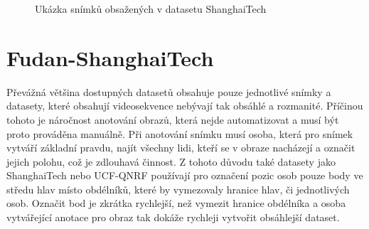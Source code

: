 \begin{figure}[h!]
	\centering
	\caption{Ukázka snímků obsažených v datasetu ShanghaiTech \cite{ShanghaiTech}}
	\label{fig:SH_TECH}
\end{figure}


\section{Fudan-ShanghaiTech}
Převážná většina dostupných datasetů obsahuje pouze jednotlivé snímky a datasety, které obsahují videosekvence nebývají tak obsáhlé a rozmanité.
Příčinou tohoto je náročnost anotování obrazů, která nejde automatizovat a musí být proto prováděna manuálně.
Při anotování snímku musí osoba, která pro snímek vytváří základní pravdu, najít všechny lidi, kteří se v obraze nacházejí a označit jejich polohu, což je zdlouhavá činnost.
Z tohoto důvodu také datasety jako ShanghaiTech nebo UCF-QNRF používají pro označení pozic osob pouze body ve středu hlav místo obdélníků, které by vymezovaly hranice hlav, či jednotlivých osob.
Označit bod je zkrátka rychlejší, než vymezit hranice obdélníka a osoba vytvářející anotace pro obraz tak dokáže rychleji vytvořit obsáhlejší dataset.

